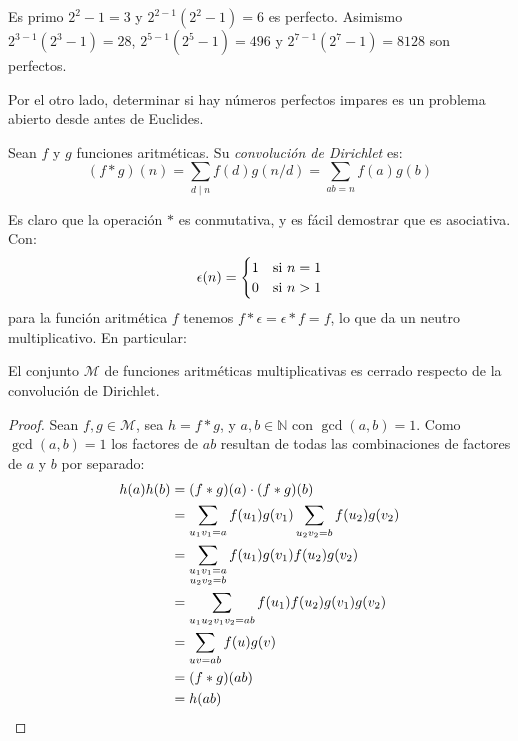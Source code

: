   Es primo \(2^2 - 1 = 3\)
  y \(2^{2 - 1} (2^2 - 1) = 6\) es perfecto.
  Asimismo \(2^{3 - 1} (2^3 - 1) = 28\),
  \(2^{5 - 1} (2^5 - 1) = 496\)
  y \(2^{7 - 1} (2^7 - 1) = 8128\)
  son perfectos.

  Por el otro lado,
  determinar si hay números perfectos impares%
  es un problema abierto
  desde antes de Euclides.

  \begin{definition}
    Sean \(f\) y \(g\) funciones aritméticas.
    Su \emph{convolución de Dirichlet} es:%
    \begin{equation}
      \label{eq:Dirichlet-convolution}
      (f * g)(n)
	= \sum_{d \mid n} f(d) g(n / d)
	= \sum_{a b = n} f(a) g(b)
    \end{equation}
  \end{definition}
  Es claro que la operación \(*\) es conmutativa,%
  y es fácil demostrar que es asociativa.%
  Con:
  \begin{equation}
    \index{\(\epsilon\) (identidad para convolucion de Dirichlet)@\(\epsilon\) (identidad para convolución de Dirichlet)}
    \label{eq:arithmetic-epsilon}
    \epsilon(n)
      = \begin{cases}
	  1 & \text{si \(n = 1\)} \\
	  0 & \text{si \(n > 1\)}
	\end{cases}
  \end{equation}
  para la función aritmética \(f\)
  tenemos \(f * \epsilon = \epsilon * f = f\),
  lo que da un neutro multiplicativo.%
  En particular:
  \begin{theorem}
    \label{theo:multiplicative-group-Dirichlet}
    El conjunto \(\mathscr{M}\)
    de funciones aritméticas multiplicativas
    es cerrado respecto de la convolución de Dirichlet.
  \end{theorem}
  \begin{proof}
    Sean \(f, g \in \mathscr{M}\),
    sea \(h = f * g\),
    y \(a, b \in \mathbb{N}\) con \(\gcd(a, b) = 1\).
    Como \(\gcd(a, b) = 1\)
    los factores de \(a b\)
    resultan de todas las combinaciones de factores de \(a\) y \(b\)
    por separado:
    \begin{align*}
      h(a) h(b)
	&= (f * g)(a) \cdot (f * g)(b) \\
	&= \sum_{u_1 v_1 = a}
	     f(u_1) g(v_1) \sum_{u_2 v_2 = b} f(u_2) g(v_2) \\
	&= \sum_{\substack{u_1 v_1 = a \\ u_2 v_2 = b}}
	     f(u_1) g(v_1) f(u_2) g(v_2) \\
	&= \sum_{u_1 u_2 v_1 v_2 = a b}
	     f(u_1) f(u_2) g(v_1) g(v_2) \\
	&= \sum_{u v = a b} f(u) g(v) \\
	&= (f * g)(a b) \\
	&= h(a b)
    \qedhere
    \end{align*}
  \end{proof}
